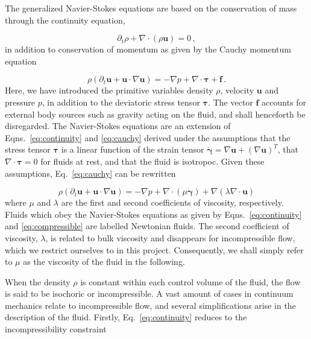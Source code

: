 \documentclass[final,3p,twocolumn]{elsarticle}
\begin{document}
The generalized Navier-Stokes equations are based on the conservation of mass
through the continuity equation,

\begin{equation}
    \partial_t \rho + \nabla \cdot (\rho {\bm u}) = 0 \,,
    \label{eq:continuity}
\end{equation}
%
in addition to conservation of momentum as given by the Cauchy momentum equation

\begin{equation}
    \rho \left( \partial_t \bm{u} + \bm{u} \cdot \nabla \bm{u} \right) 
    = - \nabla p + \nabla \cdot \bm{\tau} + \bm{f} \,.
    \label{eq:cauchy}
\end{equation}
%
Here, we have introduced the primitive variables density $\rho$, velocity
$\bm{u}$ and pressure $p$, in addition to the deviatoric stress tensor
$\bm{\tau}$. The vector $\bm{f}$ accounts for external body sources such as
gravity acting on the fluid, and shall henceforth be disregarded. The
Navier-Stokes equations are an extension of Eqns.\ \eqref{eq:continuity} and
\eqref{eq:cauchy} derived under the assumptions that the stress tensor
$\bm{\tau}$ is a linear function of the strain tensor $\dot{\bm{\gamma}}=\nabla
\bm{u} + (\nabla \bm{u})^T$, that $\nabla \cdot \bm{\tau} = 0$ for fluids at
rest, and that the fluid is isotropoc. Given these assumptions, Eq.\
\eqref{eq:cauchy} can be rewritten

\begin{equation}
    \rho \left( \partial_t \bm{u} + \bm{u} \cdot \nabla \bm{u} \right) 
    = - \nabla p + \nabla \cdot \left( \mu \dot{\bm{\gamma}} \right) + \nabla
    \left( \lambda \nabla \cdot \bm{u} \right)
    \label{eq:compressible}
\end{equation}
%
where $\mu$ and $\lambda$ are the first and second coefficients of viscosity,
respectively. Fluids which obey the Navier-Stokes equations as given by Eqns.\
\eqref{eq:continuity} and \eqref{eq:compressible} are labelled Newtonian
fluids.  The second coefficient of viscosity, $\lambda$, is related to bulk
viscosity and disappears for incompressible flow, which we restrict ourselves
to in this project. Consequently, we shall simply refer to $\mu$ as the
viscosity of the fluid in the following. 

When the density $\rho$ is constant within each control volume of the fluid,
the flow is said to be isochoric or incompressible. A vast amount of cases in
continuum mechanics relate to incompressible flow, and several simplifications
arise in the description of the fluid. Firstly, Eq.\ \eqref{eq:continuity}
reduces to the incompressibility constraint
\end{document}

